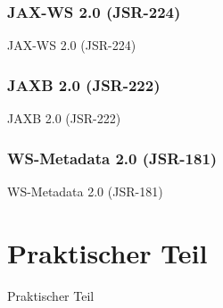 \documentclass[ucs]{beamer}
\begin{document}
  \subsubsection{JAX-WS 2.0 (JSR-224)}
  \begin{frame}{JAX-WS 2.0 (JSR-224)}
  \end{frame}

  \subsubsection{JAXB 2.0 (JSR-222)}
  \begin{frame}{JAXB 2.0 (JSR-222)}
  \end{frame}

  \subsubsection{WS-Metadata 2.0 (JSR-181)}
  \begin{frame}{WS-Metadata 2.0 (JSR-181)}
  \end{frame}


  \section{Praktischer Teil}
  \begin{frame}{Praktischer Teil}
  \end{frame}
\end{document}
